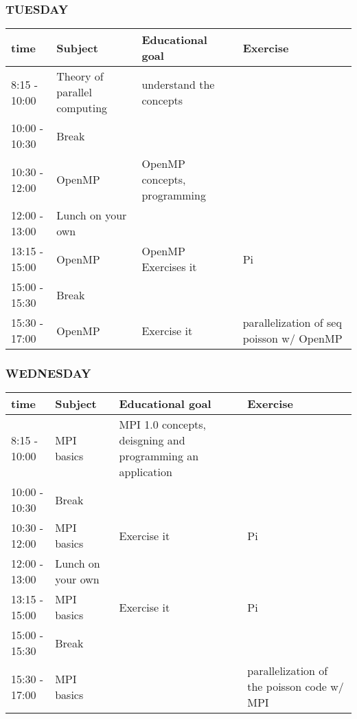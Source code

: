 \begin{frame}[containsverbatim]
\frametitle{TUESDAY}
\scriptsize
\begin{tabular}{| l | m{2.5cm} | m{2.5cm} | m{2.5cm} | }
\hline
 \textbf{time} & \textbf{Subject} & \textbf{Educational goal}& \textbf{Exercise} \\
\hline
\hline
8:15 - 10:00 & Theory of parallel computing & understand the concepts & \\
\hline
10:00 - 10:30 & Break & &\\
\hline
10:30 - 12:00 & OpenMP& OpenMP concepts, programming &  \\
\hline
12:00 - 13:00 & Lunch on your own & &\\
\hline
13:15 - 15:00 & OpenMP& OpenMP Exercises it &  Pi \\
\hline
15:00 - 15:30 & Break & &\\
\hline
15:30 - 17:00 & OpenMP& Exercise it & parallelization of seq poisson w/ OpenMP \\
\hline
\end{tabular}
\end{frame}


\begin{frame}[containsverbatim]
\frametitle{WEDNESDAY}
\scriptsize
\begin{tabular}{| l | m{2.5cm} | m{2.5cm} | m{2.5cm} | }
\hline
 \textbf{time} & \textbf{Subject} & \textbf{Educational goal}& \textbf{Exercise} \\
\hline
\hline
8:15 - 10:00 & MPI basics& MPI 1.0 concepts, deisgning and programming an application& \\
\hline
10:00 - 10:30 & Break &  & \\
\hline
10:30 - 12:00 & MPI basics& Exercise it & Pi\\
\hline
12:00 - 13:00 & Lunch on your own &  & \\
\hline
13:15 - 15:00 & MPI basics& Exercise it & Pi\\
\hline
15:00 - 15:30 & Break & & \\
\hline
15:30 - 17:00 & MPI basics& & parallelization of the poisson code w/ MPI\\
\hline
\end{tabular}
\end{frame}





